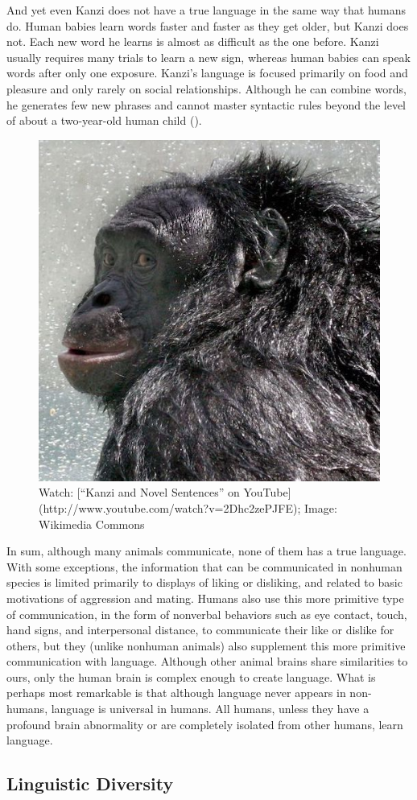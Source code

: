 \documentclass[
]{krantz}
\begin{document}
And yet even Kanzi does not have a true language in the same way that humans do. Human babies learn words faster and faster as they get older, but Kanzi does not. Each new word he learns is almost as difficult as the one before. Kanzi usually requires many trials to learn a new sign, whereas human babies can speak words after only one exposure. Kanzi's language is focused primarily on food and pleasure and only rarely on social relationships. Although he can combine words, he generates few new phrases and cannot master syntactic rules beyond the level of about a two-year-old human child ().

\begin{figure}

{\centering \includegraphics[width=0.25\linewidth]{images/ch8/kanzi} 

}

\caption{Watch: [“Kanzi and Novel Sentences” on YouTube](http://www.youtube.com/watch?v=2Dhc2zePJFE); Image: Wikimedia Commons}\label{fig:kanzi}
\end{figure}

In sum, although many animals communicate, none of them has a true language. With some exceptions, the information that can be communicated in nonhuman species is limited primarily to displays of liking or disliking, and related to basic motivations of aggression and mating. Humans also use this more primitive type of communication, in the form of nonverbal behaviors such as eye contact, touch, hand signs, and interpersonal distance, to communicate their like or dislike for others, but they (unlike nonhuman animals) also supplement this more primitive communication with language. Although other animal brains share similarities to ours, only the human brain is complex enough to create language. What is perhaps most remarkable is that although language never appears in non-humans, language is universal in humans. All humans, unless they have a profound brain abnormality or are completely isolated from other humans, learn language.

\subsection*{Linguistic Diversity}\label{linguistic-diversity}
\end{document}
